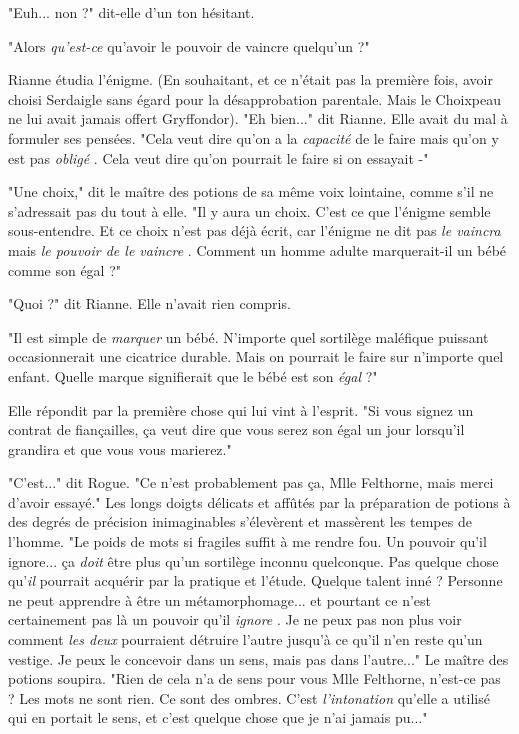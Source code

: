 "Euh... non ?" dit-elle d'un ton hésitant.

"Alors \emph{qu'est-ce}  qu'avoir le pouvoir de vaincre quelqu'un ?"

Rianne étudia l'énigme. (En souhaitant, et ce n'était pas la première fois, avoir choisi Serdaigle sans égard pour la désapprobation parentale. Mais le Choixpeau ne lui avait jamais offert Gryffondor). "Eh bien..." dit Rianne. Elle avait du mal à formuler ses pensées. "Cela veut dire qu'on a la \emph{capacité}  de le faire mais qu'on y est pas \emph{obligé} . Cela veut dire qu'on pourrait le faire si on essayait -"

"Une choix," dit le maître des potions de sa même voix lointaine, comme s'il ne s'adressait pas du tout à elle. "Il y aura un choix. C'est ce que l'énigme semble sous-entendre. Et ce choix n'est pas déjà écrit, car l'énigme ne dit pas \emph{le vaincra}  mais \emph{le pouvoir de le vaincre} . Comment un homme adulte marquerait-il un bébé comme son égal ?"

"Quoi ?" dit Rianne. Elle n'avait rien compris.

"Il est simple de \emph{marquer}  un bébé. N'importe quel sortilège maléfique puissant occasionnerait une cicatrice durable. Mais on pourrait le faire sur n'importe quel enfant. Quelle marque signifierait que le bébé est son \emph{égal}  ?"

Elle répondit par la première chose qui lui vint à l'esprit. "Si vous signez un contrat de fiançailles, ça veut dire que vous serez son égal un jour lorsqu'il grandira et que vous vous marierez."

"C'est..." dit Rogue. "Ce n'est probablement pas ça, Mlle Felthorne, mais merci d'avoir essayé." Les longs doigts délicats et affûtés par la préparation de potions à des degrés de précision inimaginables s'élevèrent et massèrent les tempes de l'homme. "Le poids de mots si fragiles suffit à me rendre fou. Un pouvoir qu'il ignore... ça \emph{doit}  être plus qu'un sortilège inconnu quelconque. Pas quelque chose qu'\emph{il}  pourrait acquérir par la pratique et l'étude. Quelque talent inné ? Personne ne peut apprendre à être un métamorphomage... et pourtant ce n'est certainement pas là un pouvoir qu'il \emph{ignore} . Je ne peux pas non plus voir comment \emph{les deux}  pourraient détruire l'autre jusqu'à ce qu'il n'en reste qu'un vestige. Je peux le concevoir dans un sens, mais pas dans l'autre..." Le maître des potions soupira. "Rien de cela n'a de sens pour vous Mlle Felthorne, n'est-ce pas ? Les mots ne sont rien. Ce sont des ombres. C'est \emph{l'intonation}  qu'elle a utilisé qui en portait le sens, et c'est quelque chose que je n'ai jamais pu..."

